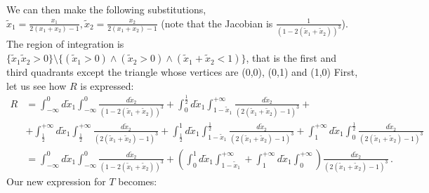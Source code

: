 \documentclass[twoside]{article}
\begin{document}
We can then make the following substitutions, $\tilde{x}_1 = \frac{x_1}{2(x_1 + x_2) - 1}, \tilde{x}_2 = \frac{x_2}{2(x_1 + x_2) - 1}$ (note that the Jacobian is $\frac{1}{(1-2(\tilde{x}_1 + \tilde{x}_2))^3}$). 
The region of integration is $\{\tilde{x}_1 \tilde{x}_2 > 0\} \setminus \{(\tilde{x}_1>0) \wedge (\tilde{x}_2>0) \wedge (\tilde{x}_1 + \tilde{x}_2 < 1)\}$, that is the first and third quadrants except the triangle whose vertices are (0,0), (0,1) and (1,0)
First, let us see how $R$ is expressed:
\begin{equation}
\begin{split}
R &= \int_{-\infty}^0 d\tilde{x}_1 \int_{-\infty}^0 \frac{d\tilde{x}_2}{(1-2(\tilde{x}_1 + \tilde{x}_2))^3} 
+ \int_0^\frac{1}{2} d\tilde{x}_1 \int_{1-\tilde{x}_1}^{+\infty} \frac{d\tilde{x}_2}{(2(\tilde{x}_1 + \tilde{x}_2)-1)^3} + \\
& + \int_{\frac{1}{2}}^{+\infty} d\tilde{x}_1 \int_{\frac{1}{2}}^{+\infty} \frac{d\tilde{x}_2}{(2(\tilde{x}_1 + \tilde{x}_2)-1)^3} + \int_{\frac{1}{2}}^1 d\tilde{x}_1 \int_{1-\tilde{x}_1}^{\frac{1}{2}} \frac{d\tilde{x}_2}{(2(\tilde{x}_1 + \tilde{x}_2)-1)^3} + \int_{1}^{+\infty} d\tilde{x}_1 \int_{0}^{\frac{1}{2}} \frac{d\tilde{x}_2}{(2(\tilde{x}_1 + \tilde{x}_2)-1)^3} \\
&= \int_{-\infty}^0 d\tilde{x}_1 \int_{-\infty}^0 \frac{d\tilde{x}_2}{(1-2(\tilde{x}_1 + \tilde{x}_2))^3} + \left(\int_0^1 d\tilde{x}_1 \int_{1-\tilde{x}_1}^{+\infty} + \int_{1}^{+\infty} d\tilde{x}_1 \int_{0}^{+\infty}\right) \frac{d\tilde{x}_2}{(2(\tilde{x}_1 + \tilde{x}_2)-1)^3}\,.
\end{split}
\end{equation}
Our new expression for $T$ becomes: 
\end{document}
